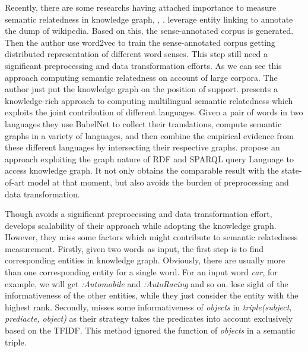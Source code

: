 Recently, there are some researchs having attached importance to measure semantic relatedness
in knowledge graph\cite{aaai/Pirro12}, \cite{aaai/NavigliP12}, \cite{acl/IacobacciPN15}. 
\cite{acl/IacobacciPN15} leverage entity linking to annotate the dump of wikipedia. Based on this,
the sense-annotated corpus is generated. Then the author use word2vec to
train the sense-annotated corpus getting distributed representation of different 
word senses. This step still need a significant preprocessing and data transformation efforts. 
As we can see this approach computing semantic relatedness on account of large corpora.
The author just put the knowledge graph on the position of support. 
\cite{aaai/NavigliP12} presents a knowledge-rich approach to computing multilingual semantic
relatedness which exploits the joint contribution of different languages. Given a pair of words 
in two languages they use BabelNet to collect their translations, compute semantic
graphs in a variety of languages, and then combine the empirical evidence from these 
different languages by intersecting their respective graphs.
\cite{aaai/Pirro12} propose an approach exploiting the graph nature of RDF and SPARQL query
Language to access knowledge graph. It not only obtains the comparable
result with the state-of-art model at that moment, but also avoids the burden
of preprocessing and data transformation.

Though \cite{aaai/Pirro12} avoids a significant preprocessing and data
transformation effort, develops scalability of their approach while adopting 
the knowledge graph. However, they miss some factors which
might contribute to semantic relatedness measurement. Firstly, given two words
as input, the first step is to find corresponding entities in knowledge
graph. Obviously, there are usually more than one corresponding entity for a single word.
For an input word \emph{car}, for example, we will get \emph{:Automobile} and
\emph{:Auto\underline{\hspace{0.5em}}Racing} and so on. \cite{aaai/Pirro12} lose
sight of the informativeness of the other entities, while they just
consider the entity with the highest rank. Secondly, \cite{aaai/Pirro12} misses
some informativeness of \emph{objects} in \emph{triple(subject, prediacte, object)} as their strategy takes
the predicates into account exclusively based on the TFIDF. This
method ignored the function of \emph{objects} in a semantic triple.

